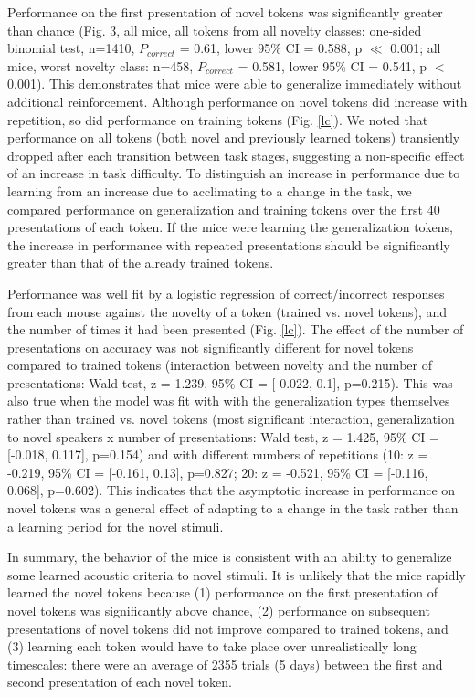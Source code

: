 \documentclass[preprint, NumberedRefs]{JASAnew}\usepackage[]{graphicx}\usepackage[]{color}
\begin{document}
Performance on the first presentation of novel tokens was significantly greater than chance (Fig. 3, all mice, all tokens from all novelty classes: one-sided binomial test, n=1410, $P_{correct}$ = 0.61, lower 95\% CI = 0.588, p $\ll$ 0.001; all mice, worst novelty class:  n=458, $P_{correct}$ = 0.581, lower 95\% CI = 0.541, p $<$ 0.001). This demonstrates that mice were able to generalize immediately without additional reinforcement. Although performance on novel tokens did increase with repetition, so did performance on training tokens (Fig. \ref{lc}). We noted that performance on all tokens (both novel and previously learned tokens) transiently dropped after each transition between task stages, suggesting a non-specific effect of an increase in task difficulty. To distinguish an increase in performance due to learning from an increase due to acclimating to a change in the task, we compared performance on generalization and training tokens over the first 40 presentations of each token. If the mice were learning the generalization tokens, the increase in performance with repeated presentations should be significantly greater than that of the already trained tokens.

Performance was well fit by a logistic regression of correct/incorrect responses from each mouse against the novelty of a token (trained vs. novel tokens), and the number of times it had been presented (Fig. \ref{lc}). The effect of the number of presentations on accuracy was not significantly different for novel tokens compared to trained tokens (interaction between novelty and the number of presentations: Wald test, z = 1.239, 95\% CI = [-0.022, 0.1], p=0.215). This was also true when the model was fit with with the generalization types themselves rather than trained vs. novel tokens (most significant interaction, generalization to novel speakers x number of presentations: Wald test, z = 1.425, 95\% CI = [-0.018, 0.117], p=0.154) and with different numbers of repetitions (10: z = -0.219, 95\% CI = [-0.161, 0.13], p=0.827; 20: z = -0.521, 95\% CI = [-0.116, 0.068], p=0.602). This indicates that the asymptotic increase in performance on novel tokens was a general effect of adapting to a change in the task rather than a learning period for the novel stimuli.

In summary, the behavior of the mice is consistent with an ability to generalize some learned acoustic criteria to novel stimuli. It is unlikely that the mice rapidly learned the novel tokens because (1) performance on the first presentation of novel tokens was significantly above chance, (2) performance on subsequent presentations of novel tokens did not improve compared to trained tokens, and (3) learning each token would have to take place over unrealistically long timescales: there were an average of 2355 trials (5 days) between the first and second presentation of each novel token.
\end{document}

